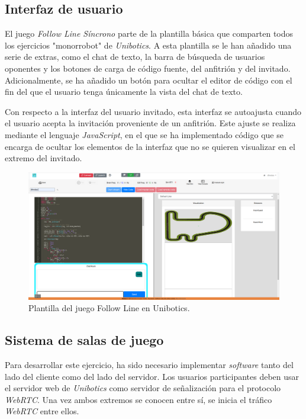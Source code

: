 \documentclass[a4paper, 12pt]{book}
\begin{document}
\subsection{Interfaz de usuario}

El juego \emph{Follow Line Síncrono} parte de la plantilla básica que comparten todos los ejercicios "monorrobot" de \emph{Unibotics}. A esta plantilla se le han añadido una serie de extras, como el chat de texto, la barra de búsqueda de usuarios oponentes y los botones de carga de código fuente, del anfitrión y del invitado. Adicionalmente, se ha añadido un botón para ocultar el editor de código con el fin del que el usuario tenga únicamente la vista del chat de texto.

Con respecto a la interfaz del usuario invitado, esta interfaz se autoajusta cuando el usuario acepta la invitación proveniente de un anfitrión. Este ajuste se realiza mediante el lenguaje \emph{JavaScript}, en el que se ha implementado código que se encarga de ocultar los elementos de la interfaz que no se quieren visualizar en el extremo del invitado.
\begin{figure}[H]
	\centering
    \includegraphics[width=15cm]{img/follow_line_game_sync.png}
    \caption{Plantilla del juego Follow Line en Unibotics.}
    \label{figura:diagrama_conexion_webrtc}
\end{figure}

\subsection{Sistema de salas de juego}

Para desarrollar este ejercicio, ha sido necesario implementar \emph{software} tanto del lado del cliente como del lado del servidor. Los usuarios participantes deben usar el servidor web de \emph{Unibotics} como servidor de señalización para el protocolo \emph{WebRTC}. Una vez ambos extremos se conocen entre sí, se inicia el tráfico \emph{WebRTC} entre ellos.
\end{document}
